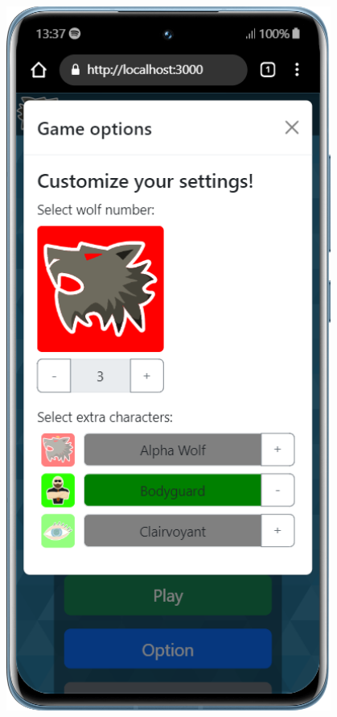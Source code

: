 \begin{figure}[H]
    \centering
    \begin{minipage}{0.25\textwidth}
        \centering
        \includegraphics[width=0.95\textwidth]{img/screen/mobile/option_mobile.png}

\end{minipage}
\end{figure}
